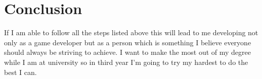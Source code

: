 \documentclass{scrartcl}
\begin{document}
\section*{Conclusion}
If I am able to follow all the steps listed above this will lead to me developing not only as a game developer but as a person which is something I believe everyone should always be striving to achieve. I want to make the most out of my degree while I am at university so in third year I'm going to try my hardest to do the best I can.
 



\end{document}
